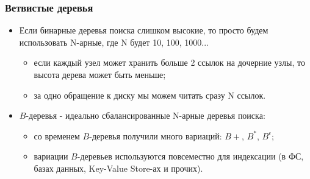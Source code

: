 \begin{frame}
\frametitle{Ветвистые деревья}
\begin{itemize}
  \item Если бинарные деревья поиска слишком высокие, то просто будем
  использовать N-арные, где N будет 10, 100, 1000...
  \begin{itemize}
    \item если каждый узел может хранить больше 2 ссылок на дочерние узлы, то
    высота дерева может быть меньше;
    \item за одно обращение к диску мы можем читать сразу N ссылок.
  \end{itemize}
  \item $B$-деревья - идеально сбалансированные N-арные деревья поиска:
  \begin{itemize}
    \item со временем $B$-деревья получили много вариаций: $B+$, $B^*$,
    $B^\epsilon$;
    \item вариации $B$-деревьев используются повсеместно для индексации (в ФС,
    базах данных, Key-Value Store-ах и прочих).
  \end{itemize}
\end{itemize}
\end{frame}
